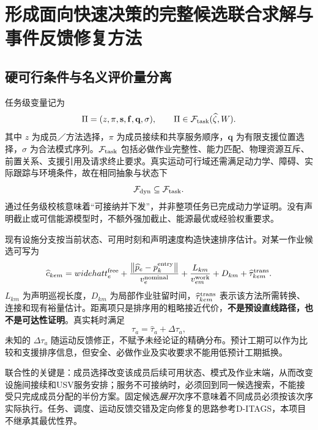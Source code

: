 \documentclass[UTF8,fontset=fandol,a4paper,11pt]{ctexart}
\newcommand{\norm}[1]{\left\lVert #1\right\rVert}
\begin{document}
\section{形成面向快速决策的完整候选联合求解与事件反馈修复方法}
\subsection{硬可行条件与名义评价量分离}

任务级变量记为
\begin{equation}
 \Pi=(z,\pi,\mathbf s,\mathbf f,\mathbf q,\sigma),
 \qquad \Pi\in\mathcal F_{\rm task}(\widehat\zeta,W).
 \label{eq:plan}
\end{equation}
其中 $z$ 为成员／方法选择，$\pi$ 为成员接续和共享服务顺序，$\mathbf q$ 为有限支援位置选择，$\sigma$ 为合法模式序列。$\mathcal F_{\rm task}$ 包括必做作业完整性、能力匹配、物理资源互斥、前置关系、支援引用及请求终止要求。真实运动可行域还需满足动力学、障碍、实际跟踪与环境条件，故在相同抽象与状态下
\begin{equation}
 \mathcal F_{\rm dyn}\subseteq\mathcal F_{\rm task}.
 \label{eq:relaxation}
\end{equation}
通过任务级校核意味着“可接纳并下发”，并非整项任务已完成动力学证明。没有声明截止或可信能源模型时，不额外强加截止、能源最优或经验权重要求。

现有设施分支按当前状态、可用时刻和声明速度构造快速排序估计。对某一作业候选可写为
\begin{equation}
 \widehat c_{kem}=widehat t_e^{\rm free}
 +\frac{\norm{\widehat p_e-p_k^{\rm entry}}}{v_e^{\rm nominal}}
 +\frac{L_{km}}{v_{em}^{\rm work}}+D_{km}+\widehat\tau_{kem}^{\rm trans}.
 \label{eq:score}
\end{equation}
$L_{km}$ 为声明巡视长度，$D_{km}$ 为局部作业驻留时间，$\widehat\tau_{kem}^{\rm trans}$ 表示该方法所需转换、连接和现有裕量估计。距离项只是排序用的粗略接近代价，\textbf{不是预设直线路径，也不是可达性证明}。真实耗时满足
\begin{equation}
 \tau_a=\widehat\tau_a+\Delta\tau_a,
 \label{eq:timeuncertainty}
\end{equation}
未知的 $\Delta\tau_a$ 随运动反馈修正，不赋予未经论证的精确分布。预计工期可以作为比较和支援排序信息，但安全、必做作业及实收要求不能用低预计工期抵换。

联合性的关键是：成员选择改变该成员后续可用状态、模式及作业末端，从而改变设施间接续和USV服务安排；服务不可接纳时，必须回到同一候选搜索，不能接受只完成成员分配的半份方案。固定候选\emph{展开}次序不意味着不同成员必须按该次序实际执行。任务、调度、运动反馈交错及定向修复的思路参考D-ITAGS\cite{ditags}，本项目不继承其最优性界。
\end{document}
